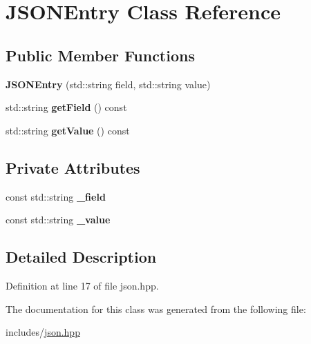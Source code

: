 \hypertarget{classJSONEntry}{}\section{J\+S\+O\+N\+Entry Class Reference}
\label{classJSONEntry}
\subsection*{Public Member Functions}
\begin{DoxyCompactItemize}
\item 
\hypertarget{classJSONEntry_a79fa7aad92300cc07a1c8efee3fd65de}{}{\bfseries J\+S\+O\+N\+Entry} (std\+::string field, std\+::string value)\label{classJSONEntry_a79fa7aad92300cc07a1c8efee3fd65de}

\item 
\hypertarget{classJSONEntry_ac48c5c3cbbbc3ccf1cd40b586f315c51}{}std\+::string {\bfseries get\+Field} () const \label{classJSONEntry_ac48c5c3cbbbc3ccf1cd40b586f315c51}

\item 
\hypertarget{classJSONEntry_aca9e9437b86102ba20b9777f8f3ed7e7}{}std\+::string {\bfseries get\+Value} () const \label{classJSONEntry_aca9e9437b86102ba20b9777f8f3ed7e7}

\end{DoxyCompactItemize}
\subsection*{Private Attributes}
\begin{DoxyCompactItemize}
\item 
\hypertarget{classJSONEntry_a706347a01e44e7ce4a388772c7a893ab}{}const std\+::string {\bfseries \+\_\+field}\label{classJSONEntry_a706347a01e44e7ce4a388772c7a893ab}

\item 
\hypertarget{classJSONEntry_ae7d1509f9d86c4d041d389aa3d3a92bb}{}const std\+::string {\bfseries \+\_\+value}\label{classJSONEntry_ae7d1509f9d86c4d041d389aa3d3a92bb}

\end{DoxyCompactItemize}


\subsection{Detailed Description}


Definition at line 17 of file json.\+hpp.



The documentation for this class was generated from the following file\+:\begin{DoxyCompactItemize}
\item 
includes/\hyperlink{json_8hpp}{json.\+hpp}\end{DoxyCompactItemize}
